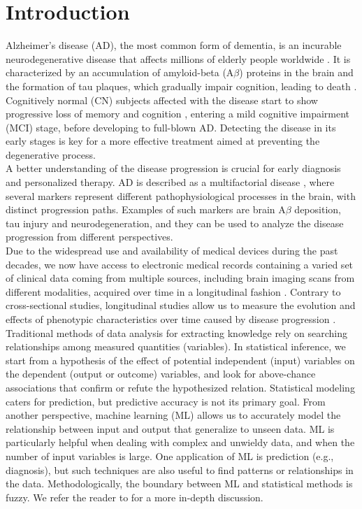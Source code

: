 
\section{Introduction}

Alzheimer's disease (AD), the most common form of dementia, is an incurable neurodegenerative disease that affects millions of elderly people worldwide \cite{Ferri2005,Prince2013}. It is characterized by an accumulation of amyloid-beta (A$\beta$) proteins in the brain and the formation of tau plaques, which gradually impair cognition, leading to death \cite{Ballard2011}. Cognitively normal (CN) subjects affected with the disease start to show progressive loss of memory and cognition \cite{Backman2004}, entering a mild cognitive impairment (MCI) stage, before developing to full-blown AD. Detecting the disease in its early stages is key for a more effective treatment aimed at preventing the degenerative process.  \\

A better understanding of the disease progression is crucial for early diagnosis and personalized therapy. AD is described as a multifactorial disease \cite{Jack2010}, where several markers represent different pathophysiological processes in the brain, with distinct progression paths. Examples of such markers are brain A$\beta$ deposition, tau injury and neurodegeneration, and they can be used to analyze the disease progression from different perspectives. \\ 

Due to the widespread use and availability of medical devices during the past decades, we now have access to electronic medical records containing a varied set of clinical data coming from multiple sources, including brain imaging scans from different modalities, acquired over time in a longitudinal fashion \cite{Lawrence2017}.  Contrary to cross-sectional studies, longitudinal studies allow us to measure the evolution and effects of phenotypic characteristics over time caused by disease progression \cite{Mills2014}. \\

Traditional methods of data analysis for extracting knowledge rely on searching relationships among measured quantities (variables). In statistical inference, we start from a hypothesis of the effect of potential independent (input) variables on the dependent (output or outcome) variables, and look for above-chance associations that confirm or refute the hypothesized relation. Statistical modeling caters for prediction, but predictive accuracy is not its primary goal. From another perspective, machine learning (ML) allows us to accurately model the relationship between input and output that generalize to unseen data. ML is particularly helpful when dealing with complex and unwieldy data, and when the number of input variables is large. One application of ML is prediction (e.g., diagnosis), but such techniques are also useful to find patterns or relationships in the data. Methodologically, the boundary between ML and statistical methods is fuzzy. We refer the reader to \cite{Breiman2001,Shmueli2010} for a more in-depth discussion. \\

